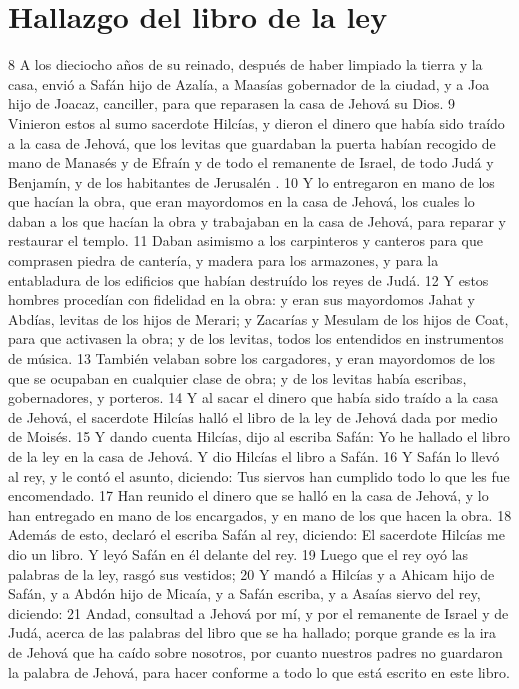 \section*{Hallazgo del libro de la ley}

8 A los dieciocho años de su reinado, después de haber limpiado la tierra y la casa, envió a Safán hijo de Azalía, a Maasías gobernador de la ciudad, y a Joa hijo de Joacaz, canciller, para que reparasen la casa de Jehová su Dios.
9 Vinieron estos al sumo sacerdote Hilcías, y dieron el dinero que había sido traído a la casa de Jehová, que los levitas que guardaban la puerta habían recogido de mano de Manasés y de Efraín y de todo el remanente de Israel, de todo Judá y Benjamín, y de los habitantes de Jerusalén .
10 Y lo entregaron en mano de los que hacían la obra, que eran mayordomos en la casa de Jehová, los cuales lo daban a los que hacían la obra y trabajaban en la casa de Jehová, para reparar y restaurar el templo.
11 Daban asimismo a los carpinteros y canteros para que comprasen piedra de cantería, y madera para los armazones, y para la entabladura de los edificios que habían destruído los reyes de Judá.
12 Y estos hombres procedían con fidelidad en la obra: y eran sus mayordomos Jahat y Abdías, levitas de los hijos de Merari; y Zacarías y Mesulam de los hijos de Coat, para que activasen la obra; y de los levitas, todos los entendidos en instrumentos de música.
13 También velaban sobre los cargadores, y eran mayordomos de los que se ocupaban en cualquier clase de obra; y de los levitas había escribas, gobernadores, y porteros.
14 Y al sacar el dinero que había sido traído a la casa de Jehová, el sacerdote Hilcías halló el libro de la ley de Jehová dada por medio de Moisés.
15 Y dando cuenta Hilcías, dijo al escriba Safán: Yo he hallado el libro de la ley en la casa de Jehová. Y dio Hilcías el libro a Safán.
16 Y Safán lo llevó al rey, y le contó el asunto, diciendo: Tus siervos han cumplido todo lo que les fue encomendado.
17 Han reunido el dinero que se halló en la casa de Jehová, y lo han entregado en mano de los encargados, y en mano de los que hacen la obra.
18 Además de esto, declaró el escriba Safán al rey, diciendo: El sacerdote Hilcías me dio un libro. Y leyó Safán en él delante del rey.
19 Luego que el rey oyó las palabras de la ley, rasgó sus vestidos;
20 Y mandó a Hilcías y a Ahicam hijo de Safán, y a Abdón hijo de Micaía, y a Safán escriba, y a Asaías siervo del rey, diciendo:
21 Andad, consultad a Jehová por mí, y por el remanente de Israel y de Judá, acerca de las palabras del libro que se ha hallado; porque grande es la ira de Jehová que ha caído sobre nosotros, por cuanto nuestros padres no guardaron la palabra de Jehová, para hacer conforme a todo lo que está escrito en este libro.
